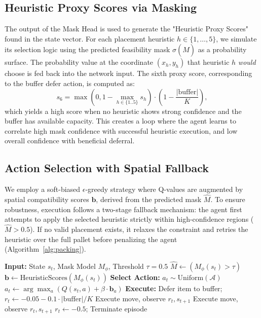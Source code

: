 \documentclass[runningheads]{llncs}
\begin{document}
\subsection{Heuristic Proxy Scores via Masking}
\label{sec:mask_bias}
The output of the Mask Head is used to generate the "Heuristic Proxy Scores" found in the state vector. For each placement heuristic $h \in \{1, \dots, 5\}$, we simulate its selection logic using the predicted feasibility mask $\sigma(\hat{M})$ as a probability surface. The probability value at the coordinate $(x_h, y_h)$ that heuristic $h$ \textit{would} choose is fed back into the network input. The sixth proxy score, corresponding to the buffer defer action, is computed as:
\begin{equation}
    s_6 = \max(0, 1 - \max_{h \in \{1..5\}} s_h) \cdot \left(1 - \frac{|\text{buffer}|}{K}\right),
\end{equation}
which yields a high score when no heuristic shows strong confidence and the buffer has available capacity. This creates a loop where the agent learns to correlate high mask confidence with successful heuristic execution, and low overall confidence with beneficial deferral.

\subsection{Action Selection with Spatial Fallback}
We employ a soft-biased $\epsilon$-greedy strategy where Q-values are augmented by spatial compatibility scores $\mathbf{b}$, derived from the predicted mask $\hat{M}$. To ensure robustness, execution follows a two-stage fallback mechanism: the agent first attempts to apply the selected heuristic strictly within high-confidence regions ($\hat{M} > 0.5$). If no valid placement exists, it relaxes the constraint and retries the heuristic over the full pallet before penalizing the agent (Algorithm~\ref{alg:packing}).

\begin{algorithm}
\caption{Spatially Biased Execution with Fallback}
\label{alg:packing}
\begin{algorithmic}[1]
\State \textbf{Input:} State $s_t$, Mask Model $M_\phi$, Threshold $\tau=0.5$
\State $\hat{M} \gets (M_\phi(s_t) > \tau)$ 
\State $\mathbf{b} \gets \text{HeuristicScores}(M_\phi(s_t))$
\State \textbf{Select Action:}
 \State $a_t \sim \text{Uniform}(\mathcal{A})$
\Else \State $a_t \gets \arg\max_a (Q(s_t, a) + \beta \cdot \mathbf{b}_a)$
\EndIf
\State \textbf{Execute:}
    \State Defer item to buffer; $r_t \gets -0.05 - 0.1 \cdot |\text{buffer}|/K$
    \State Execute move, observe $r_t, s_{t+1}$
    \State Execute move, observe $r_t, s_{t+1}$ 
\Else
    \State $r_t \gets -0.5$; Terminate episode 
\EndIf
\end{algorithmic}
\end{algorithm}
\end{document}
